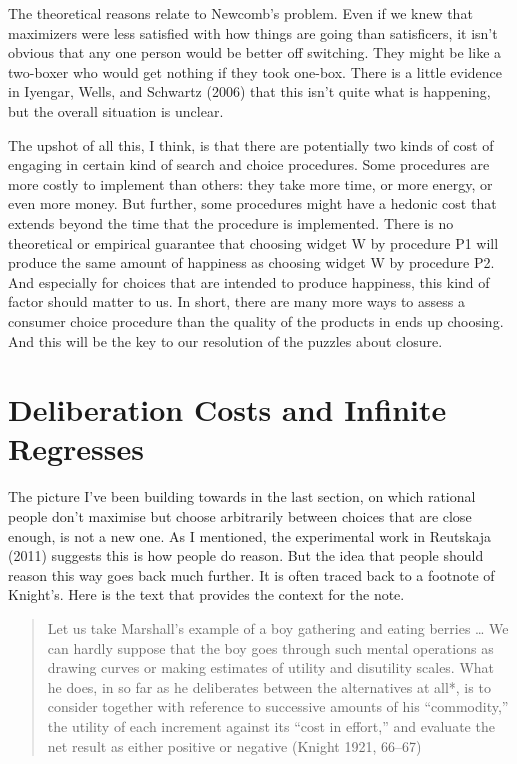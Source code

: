 \documentclass[
  12pt,
]{article}
\begin{document}
The theoretical reasons relate to Newcomb's problem. Even if we knew that maximizers were less satisfied with how things are going than satisficers, it isn't obvious that any one person would be better off switching. They might be like a two-boxer who would get nothing if they took one-box. There is a little evidence in Iyengar, Wells, and Schwartz (2006) that this isn't quite what is happening, but the overall situation is unclear.

The upshot of all this, I think, is that there are potentially two kinds of cost of engaging in certain kind of search and choice procedures. Some procedures are more costly to implement than others: they take more time, or more energy, or even more money. But further, some procedures might have a hedonic cost that extends beyond the time that the procedure is implemented. There is no theoretical or empirical guarantee that choosing widget W by procedure P1 will produce the same amount of happiness as choosing widget W by procedure P2. And especially for choices that are intended to produce happiness, this kind of factor should matter to us. In short, there are many more ways to assess a consumer choice procedure than the quality of the products in ends up choosing. And this will be the key to our resolution of the puzzles about closure.

\hypertarget{deliberationcosts}{%
\section{Deliberation Costs and Infinite Regresses}\label{deliberationcosts}}

The picture I've been building towards in the last section, on which rational people don't maximise but choose arbitrarily between choices that are close enough, is not a new one. As I mentioned, the experimental work in Reutskaja (2011) suggests this is how people do reason. But the idea that people should reason this way goes back much further. It is often traced back to a footnote of Knight's. Here is the text that provides the context for the note.

\begin{quote}
Let us take Marshall's example of a boy gathering and eating berries \ldots{} We can hardly suppose that the boy goes through such mental operations as drawing curves or making estimates of utility and disutility scales. What he does, in so far as he deliberates between the alternatives at all*, is to consider together with reference to successive amounts of his ``commodity,'' the utility of each increment against its ``cost in effort,'' and evaluate the net result as either positive or negative (Knight 1921, 66--67)
\end{quote}
\end{document}
